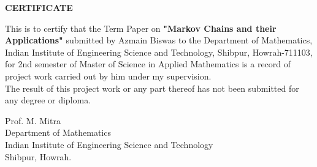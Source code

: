 \vspace{10cm}
\begin{center}
    \LARGE{\textbf{CERTIFICATE}}
\end{center}

\vspace*{2cm}
This is to certify that the Term Paper on \textbf{"Markov Chains and their Applications"} submitted by Azmain Biswas to the Department of Mathematics, Indian Institute of Engineering Science and Technology, Shibpur, Howrah-711103, for 2nd semester of Master of Science in Applied Mathematics is a record of project work carried out by him under my supervision. \\
The result of this project work or any part thereof has not been submitted for any degree or diploma.
\vspace{4cm}
\begin{flushright}
    Prof. M. Mitra\\
    Department of Mathematics\\
    Indian Institute of Engineering Science and Technology\\
    Shibpur, Howrah.
\end{flushright}
